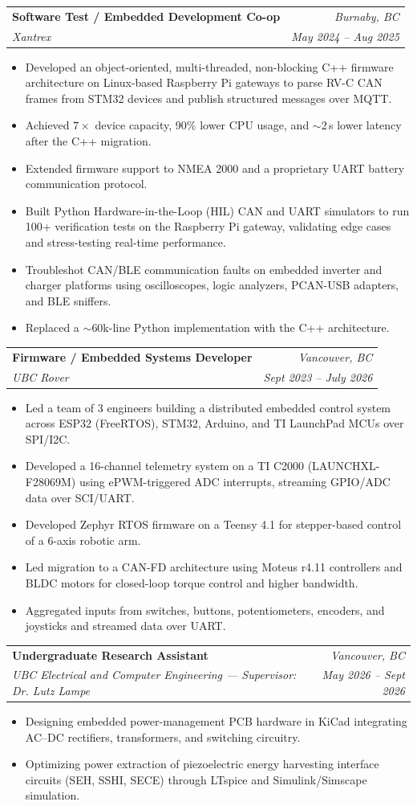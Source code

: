 \documentclass[letterpaper,11pt]{article}
\makeatletter
\newcommand{\resumeItem}[1]{
  \item\small{
    {#1 \vspace{-2pt}}
  }
}
\newcommand{\resumeSubheading}[4]{
  \vspace{-2pt}\item
    \begin{tabular*}{0.97\textwidth}[t]{l@{\extracolsep{\fill}}r}
      \textbf{#1} & \textit{\small #4} \\
      \textit{\small#3} & \textit{\small #2} \\
    \end{tabular*}\vspace{-7pt}
}
\newcommand{\resumeItemListStart}{\begin{itemize}[leftmargin=0.2in]}
\newcommand{\resumeItemListEnd}{\end{itemize}\vspace{-5pt}}
\makeatother
\begin{document}
\resumeSubheading
      {Software Test / Embedded Development Co-op}{May 2024 -- Aug 2025}
      {Xantrex}{Burnaby, BC}
      \resumeItemListStart
        \resumeItem{Developed an object-oriented, multi-threaded, non-blocking C++ firmware architecture on Linux-based Raspberry Pi gateways to parse RV-C CAN frames from STM32 devices and publish structured messages over MQTT.}
        \resumeItem{Achieved $7\times$ device capacity, 90\% lower CPU usage, and $\sim$2\,s lower latency after the C++ migration.}
        \resumeItem{Extended firmware support to NMEA 2000 and a proprietary UART battery communication protocol.}
        \resumeItem{Built Python Hardware-in-the-Loop (HIL) CAN and UART simulators to run 100+ verification tests on the Raspberry Pi gateway, validating edge cases and stress-testing real-time performance.}
        \resumeItem{Troubleshot CAN/BLE communication faults on embedded inverter and charger platforms using oscilloscopes, logic analyzers, PCAN-USB adapters, and BLE sniffers.}
        \resumeItem{Replaced a $\sim$60k-line Python implementation with the C++ architecture.}
      \resumeItemListEnd

    \resumeSubheading
      {Firmware / Embedded Systems Developer}{Sept 2023 -- July 2026}
      {UBC Rover}{Vancouver, BC}
      \resumeItemListStart
        \resumeItem{Led a team of 3 engineers building a distributed embedded control system across ESP32 (FreeRTOS), STM32, Arduino, and TI LaunchPad MCUs over SPI/I2C.}
        \resumeItem{Developed a 16-channel telemetry system on a TI C2000 (LAUNCHXL-F28069M) using ePWM-triggered ADC interrupts, streaming GPIO/ADC data over SCI/UART.}
        \resumeItem{Developed Zephyr RTOS firmware on a Teensy 4.1 for stepper-based control of a 6-axis robotic arm.}
        \resumeItem{Led migration to a CAN-FD architecture using Moteus r4.11 controllers and BLDC motors for closed-loop torque control and higher bandwidth.}
        \resumeItem{Aggregated inputs from switches, buttons, potentiometers, encoders, and joysticks and streamed data over UART.}
      \resumeItemListEnd

    \resumeSubheading
      {Undergraduate Research Assistant}{May 2026 -- Sept 2026}
      {UBC Electrical and Computer Engineering --- Supervisor: Dr. Lutz Lampe}{Vancouver, BC}
      \resumeItemListStart
        \resumeItem{Designing embedded power-management PCB hardware in KiCad integrating AC--DC rectifiers, transformers, and switching circuitry.}
        \resumeItem{Optimizing power extraction of piezoelectric energy harvesting interface circuits (SEH, SSHI, SECE) through LTspice and Simulink/Simscape simulation.}
      \resumeItemListEnd
\end{document}
